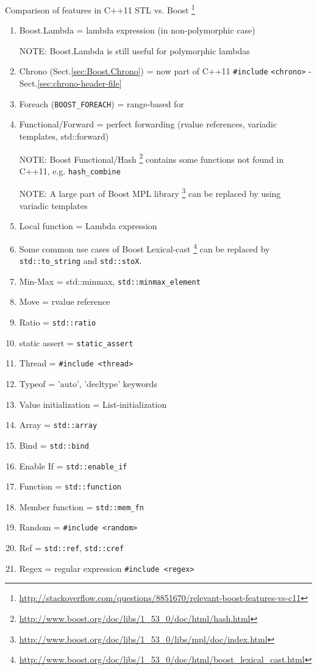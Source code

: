 Comparison of features in C++11 STL vs. Boost
\footnote{\url{http://stackoverflow.com/questions/8851670/relevant-boost-features-vs-c11}}
\begin{enumerate}
  \item Boost.Lambda = lambda expression (in non-polymorphic case) 
  
  NOTE: Boost.Lambda is still useful for polymorphic lambdas
  
  \item Chrono (Sect.\ref{sec:Boost.Chrono}) = now part of C++11 \verb!#include!
  \verb!<chrono>! - Sect.\ref{sec:chrono-header-file}
   
    
  \item Foreach (\verb!BOOST_FOREACH!) = range-based for
  
  \item Functional/Forward = perfect forwarding (rvalue references, variadic
  templates, std::forward)
  
  NOTE: Boost Functional/Hash
  \footnote{\url{http://www.boost.org/doc/libs/1_53_0/doc/html/hash.html}}
  contains some functions not found in C++11, e.g. \verb!hash_combine!
  
  NOTE: A large part of Boost MPL library
  \footnote{\url{http://www.boost.org/doc/libs/1_53_0/libs/mpl/doc/index.html}}
  can be replaced by using variadic templates
  
  \item Local function = Lambda expression

  \item Some common use cases of Boost Lexical-cast
  \footnote{\url{http://www.boost.org/doc/libs/1_53_0/doc/html/boost_lexical_cast.html}}
  can be replaced by \verb!std::to_string! and \verb!std::stoX!.
  
  \item Min-Max = std::minmax, \verb!std::minmax_element!
  \item Move = rvalue reference
  \item Ratio = \verb!std::ratio!
  \item static assert = \verb!static_assert!
  \item Thread = \verb!#include <thread>!
  \item Typeof = 'auto', 'decltype' keywords
  \item Value initialization = List-initialization
  \item Array = \verb!std::array!
  \item Bind = \verb!std::bind!
  \item Enable If = \verb!std::enable_if!
  \item Function = \verb!std::function!
  \item Member function = \verb!std::mem_fn!
  \item Random = \verb!#include <random>!
  \item Ref  = \verb!std::ref!, \verb!std::cref!
  \item Regex = regular expression \verb!#include <regex>!
  

\end{enumerate}
